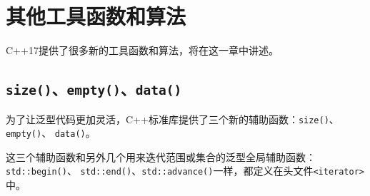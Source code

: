 \chapter{其他工具函数和算法}\label{ch25}
C++17提供了很多新的工具函数和算法，将在这一章中讲述。


\section{\texttt{size()}、\texttt{empty()}、\texttt{data()}}
为了让泛型代码更加灵活，C++标准库提供了三个新的辅助函数：\texttt{size()}、\texttt{empty()}、
\texttt{data()}。

这三个辅助函数和另外几个用来迭代范围或集合的泛型全局辅助函数：\texttt{std::begin()}、
\texttt{std::end()}、\texttt{std::advance()}一样，都定义在头文件\texttt{<iterator>}中。

